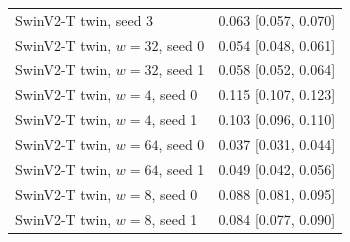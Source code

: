 \begin{tabular}{lc}
SwinV2-T twin, seed 3 & 0.063 [0.057, 0.070] \\
SwinV2-T twin, $w=32$, seed 0 & 0.054 [0.048, 0.061] \\
SwinV2-T twin, $w=32$, seed 1 & 0.058 [0.052, 0.064] \\
SwinV2-T twin, $w=4$, seed 0 & 0.115 [0.107, 0.123] \\
SwinV2-T twin, $w=4$, seed 1 & 0.103 [0.096, 0.110] \\
SwinV2-T twin, $w=64$, seed 0 & 0.037 [0.031, 0.044] \\
SwinV2-T twin, $w=64$, seed 1 & 0.049 [0.042, 0.056] \\
SwinV2-T twin, $w=8$, seed 0 & 0.088 [0.081, 0.095] \\
SwinV2-T twin, $w=8$, seed 1 & 0.084 [0.077, 0.090] \\
\bottomrule
\end{tabular}
